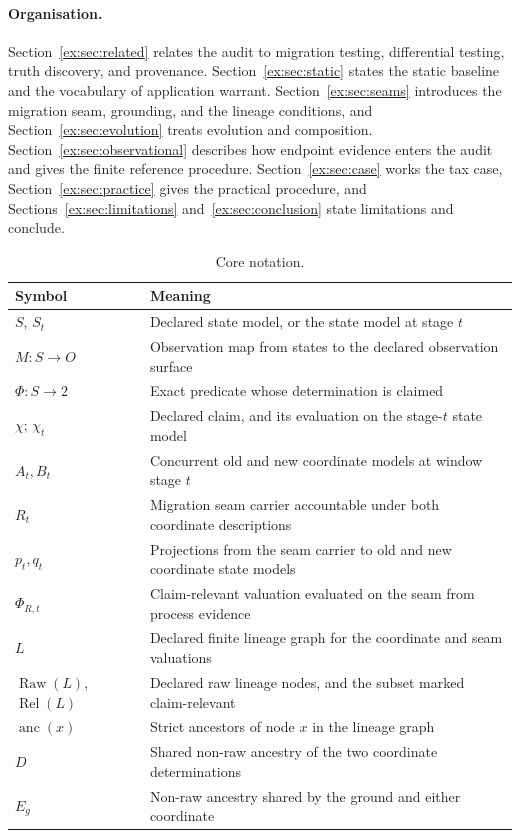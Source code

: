\documentclass[smallextended,envcountsect,envcountsame,natbib]{svjour3}
\begin{document}
\paragraph{Organisation.} Section~\ref{ex:sec:related} relates the audit to migration testing, differential testing, truth discovery, and provenance. Section~\ref{ex:sec:static} states the static baseline and the vocabulary of application warrant. Section~\ref{ex:sec:seams} introduces the migration seam, grounding, and the lineage conditions, and Section~\ref{ex:sec:evolution} treats evolution and composition. Section~\ref{ex:sec:observational} describes how endpoint evidence enters the audit and gives the finite reference procedure. Section~\ref{ex:sec:case} works the tax case, Section~\ref{ex:sec:practice} gives the practical procedure, and Sections~\ref{ex:sec:limitations} and~\ref{ex:sec:conclusion} state limitations and conclude.

\begin{table}[htbp]
\centering
\small
\caption{Core notation.}
\label{ex:tab:notation}
\begin{tabularx}{\textwidth}{@{}p{2.8cm}L@{}}
\toprule
Symbol & Meaning \\
\midrule
$S$, $S_t$ & Declared state model, or the state model at stage $t$ \\
$M:S\to O$ & Observation map from states to the declared observation surface \\
$\Phi:S\to 2$ & Exact predicate whose determination is claimed \\
$\chi$; $\chi_t$ & Declared claim, and its evaluation on the stage-$t$ state model \\
$A_t,B_t$ & Concurrent old and new coordinate models at window stage $t$ \\
$R_t$ & Migration seam carrier accountable under both coordinate descriptions \\
$p_t,q_t$ & Projections from the seam carrier to old and new coordinate state models \\
$\Phi_{R,t}$ & Claim-relevant valuation evaluated on the seam from process evidence \\
$L$ & Declared finite lineage graph for the coordinate and seam valuations \\
$\operatorname{Raw}(L)$, $\operatorname{Rel}(L)$ & Declared raw lineage nodes, and the subset marked claim-relevant \\
$\operatorname{anc}(x)$ & Strict ancestors of node $x$ in the lineage graph \\
$D$ & Shared non-raw ancestry of the two coordinate determinations \\
$E_g$ & Non-raw ancestry shared by the ground and either coordinate \\
\bottomrule
\end{tabularx}
\end{table}
\end{document}
